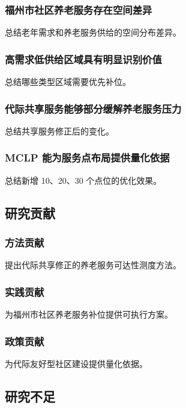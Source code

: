 \documentclass[UTF8,zihao=-4,a4paper,fontset=none]{ctexart}
\begin{document}
\subsubsection{福州市社区养老服务存在空间差异}

总结老年需求和养老服务供给的空间分布差异。

\subsubsection{高需求低供给区域具有明显识别价值}

总结哪些类型区域需要优先补位。

\subsubsection{代际共享服务能够部分缓解养老服务压力}

总结共享服务修正后的变化。

\subsubsection{MCLP 能为服务点布局提供量化依据}

总结新增 10、20、30 个点位的优化效果。

\subsection{研究贡献}

\subsubsection{方法贡献}

提出代际共享修正的养老服务可达性测度方法。

\subsubsection{实践贡献}

为福州市社区养老服务补位提供可执行方案。

\subsubsection{政策贡献}

为代际友好型社区建设提供量化依据。

\subsection{研究不足}
\end{document}

